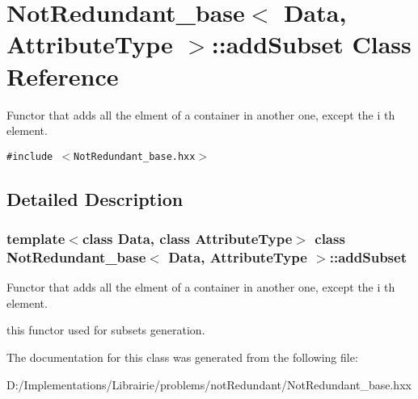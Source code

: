 \section{Not\-Redundant\_\-base$<$ Data, Attribute\-Type $>$::add\-Subset Class Reference}
\label{class_not_redundant__base_1_1add_subset}
Functor that adds all the elment of a container in another one, except the i th element.  


{\tt \#include $<$Not\-Redundant\_\-base.hxx$>$}



\subsection{Detailed Description}
\subsubsection*{template$<$class Data, class Attribute\-Type$>$ class Not\-Redundant\_\-base$<$ Data, Attribute\-Type $>$::add\-Subset}

Functor that adds all the elment of a container in another one, except the i th element. 

this functor used for subsets generation. 



The documentation for this class was generated from the following file:\begin{CompactItemize}
\item 
D:/Implementations/Librairie/problems/not\-Redundant/Not\-Redundant\_\-base.hxx\end{CompactItemize}
